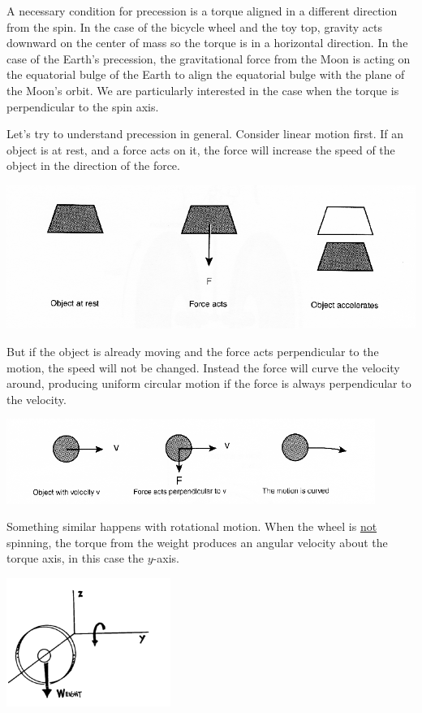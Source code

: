 A necessary condition for precession is a torque aligned in a different direction from the spin.  In the case of the bicycle wheel and the toy top, gravity acts downward on the center of mass so the torque is in a horizontal direction.  In the case of the Earth's precession, the gravitational force from the Moon is acting on the equatorial bulge of the Earth to align the equatorial bulge with the plane of the Moon's orbit.  We are particularly interested in the case when the torque is perpendicular to the spin axis.

Let's try to understand precession in general.  Consider linear motion first.  If an object is at rest, and a force acts on it, the force will increase the speed of the object in the direction of the force.
\begin{center} \includegraphics*[width=1.0\textwidth]{imgs/6labs/6Alab/6Aexp7/object_at_rest_sm.png} \end{center}
But if the object is already moving and the force acts perpendicular to the motion, the speed will not be changed.  Instead the force will curve the velocity around, producing uniform circular motion if the force is always perpendicular to the velocity.
\begin{center} \includegraphics*[width=0.9\textwidth]{imgs/6labs/6Alab/6Aexp7/object_w_velocity_sm.png} \end{center}
Something similar happens with rotational motion.  When the wheel is \ul{not} spinning, the torque from the weight produces an angular velocity about the torque axis, in this case the \(y\)-axis.
\begin{center} \includegraphics*[width=0.4\textwidth]{imgs/6labs/6Alab/6Aexp7/6A-exp7_fig4.png} \end{center}
